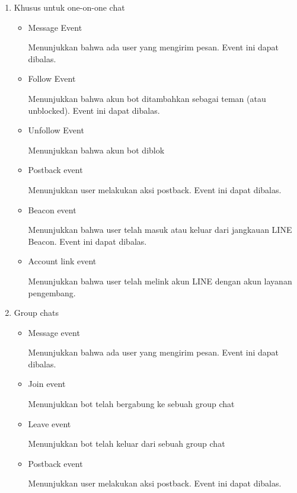 \begin{enumerate}
\item Khusus untuk one-on-one chat

\begin{itemize}
\item Message Event

Menunjukkan bahwa ada user yang mengirim pesan. Event ini dapat dibalas.

\item Follow Event

Menunjukkan bahwa akun bot ditambahkan sebagai teman (atau unblocked). Event ini dapat dibalas.

\item Unfollow Event

Menunjukkan bahwa akun bot diblok

\item Postback event

Menunjukkan user melakukan aksi postback. Event ini dapat dibalas.

\item Beacon event

Menunjukkan bahwa user telah masuk atau keluar dari jangkauan LINE Beacon. Event ini dapat dibalas.

\item Account link event 

Menunjukkan bahwa user telah melink akun LINE dengan akun layanan pengembang. 

\end{itemize}

\item Group chats

\begin{itemize}
\item Message event

Menunjukkan bahwa ada user yang mengirim pesan. Event ini dapat dibalas.

\item Join event

Menunjukkan bot telah bergabung ke sebuah group chat

\item Leave event

Menunjukkan bot telah keluar dari sebuah group chat

\item Postback event

Menunjukkan user melakukan aksi postback. Event ini dapat dibalas.

\end{itemize}

\end{enumerate}

